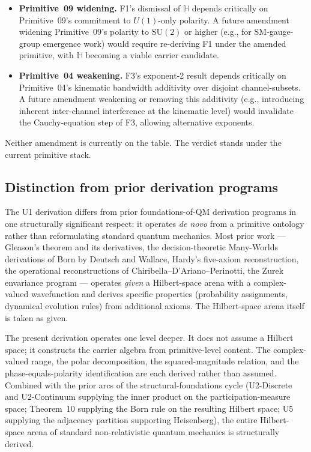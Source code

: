 \documentclass[11pt,a4paper]{article}
\begin{document}
\begin{itemize}
  \item \textbf{Primitive~09 widening.} F1's dismissal of $\mathbb{H}$ depends critically on Primitive~09's commitment to $U(1)$-only polarity. A future amendment widening Primitive~09's polarity to $\mathrm{SU}(2)$ or higher (e.g., for SM-gauge-group emergence work) would require re-deriving F1 under the amended primitive, with $\mathbb{H}$ becoming a viable carrier candidate.
  \item \textbf{Primitive~04 weakening.} F3's exponent-2 result depends critically on Primitive~04's kinematic bandwidth additivity over disjoint channel-subsets. A future amendment weakening or removing this additivity (e.g., introducing inherent inter-channel interference at the kinematic level) would invalidate the Cauchy-equation step of F3, allowing alternative exponents.
\end{itemize}

Neither amendment is currently on the table. The verdict stands under the current primitive stack.

\subsection{Distinction from prior derivation programs}

The U1 derivation differs from prior foundations-of-QM derivation programs in one structurally significant respect: it operates \emph{de novo} from a primitive ontology rather than reformulating standard quantum mechanics. Most prior work --- Gleason's theorem and its derivatives, the decision-theoretic Many-Worlds derivations of Born by Deutsch and Wallace, Hardy's five-axiom reconstruction, the operational reconstructions of Chiribella--D'Ariano--Perinotti, the Zurek envariance program --- operates \emph{given} a Hilbert-space arena with a complex-valued wavefunction and derives specific properties (probability assignments, dynamical evolution rules) from additional axioms. The Hilbert-space arena itself is taken as given.

The present derivation operates one level deeper. It does not assume a Hilbert space; it constructs the carrier algebra from primitive-level content. The complex-valued range, the polar decomposition, the squared-magnitude relation, and the phase-equals-polarity identification are each derived rather than assumed. Combined with the prior arcs of the structural-foundations cycle (U2-Discrete and U2-Continuum supplying the inner product on the participation-measure space; Theorem~10 supplying the Born rule on the resulting Hilbert space; U5 supplying the adjacency partition supporting Heisenberg), the entire Hilbert-space arena of standard non-relativistic quantum mechanics is structurally derived.
\end{document}
